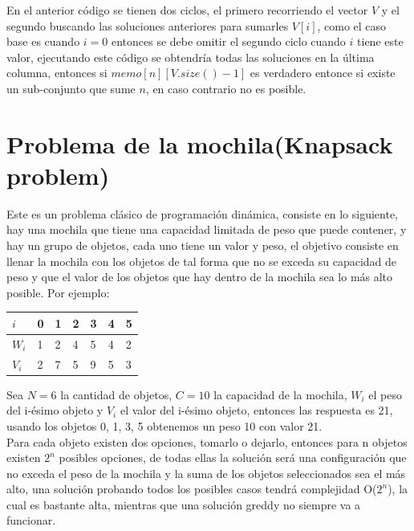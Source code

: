 \documentclass[12pt, a4paper]{article}
\begin{document}
	En el anterior código se tienen dos ciclos, el primero recorriendo el vector $V$ y el segundo buscando las 
	soluciones anteriores para sumarles $V[i]$, como el caso base es cuando $i=0$ entonces se debe omitir el segundo
	ciclo cuando $i$ tiene este valor, ejecutando este código se obtendría todas las soluciones en la última columna,
	entonces si $memo[n][V.size()-1]$ es verdadero entonce si existe un sub-conjunto que sume $n$, en caso contrario
	no es posible.

	\section{Problema de la mochila(Knapsack problem)}
	
	Este es un problema clásico de programación dinámica, consiste en lo siguiente, hay una mochila que tiene una
	capacidad limitada de peso que puede contener, y hay un grupo de objetos, cada uno tiene un valor y peso, el
	objetivo consiste en llenar la mochila con los objetos de tal forma que no se exceda su capacidad de peso y 
	que el valor de los objetos que hay dentro de la mochila sea lo más alto posible. Por ejemplo:
	\begin{center}
		\begin{tabular}{|l|l|l|l|l|l|l|}
			\hline
			$i$  	&0 &1 &2 &3 &4 &5 \\ \hline
			$W_{i}$ &1 &2 &4 &5 &4 &2 \\ \hline
			$V_{i}$ &2 &7 &5 &9 &5 &3 \\ \hline
		\end{tabular}
	\end{center}
	Sea $N=6$ la cantidad de objetos, $C=10$ la capacidad de la mochila, $W_{i}$ el peso del i-ésimo objeto y 
	$V_{i}$ el valor del i-ésimo objeto, entonces las respuesta es 21, usando los objetos 0, 1, 3, 5 obtenemos un peso 
	10 con valor 21.\\
	
	Para cada objeto existen dos opciones, tomarlo o dejarlo, entonces para n objetos existen $2^{n}$ posibles 
	opciones, de todas ellas la solución será una configuración que no exceda el peso de la mochila y la suma de los
	objetos seleccionados sea el más alto, una solución probando todos los posibles casos tendrá complejidad 
	O($2^{n}$), la cual es bastante alta, mientras que una solución greddy no siempre va a funcionar.\\
\end{document}
